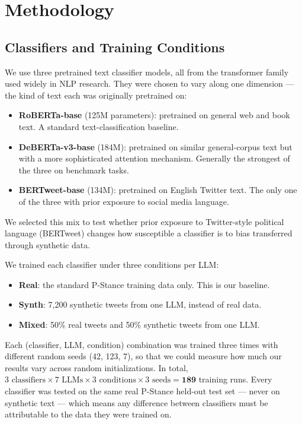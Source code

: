 \documentclass[11pt]{article}
\begin{document}
\section{Methodology}

\subsection{Classifiers and Training Conditions}

We use three pretrained text classifier models, all from the transformer family used widely in NLP research. They were chosen to vary along one dimension --- the kind of text each was originally pretrained on:
\begin{itemize}
    \item \textbf{RoBERTa-base} (125M parameters): pretrained on general web and book text. A standard text-classification baseline.
    \item \textbf{DeBERTa-v3-base} (184M): pretrained on similar general-corpus text but with a more sophisticated attention mechanism. Generally the strongest of the three on benchmark tasks.
    \item \textbf{BERTweet-base} (134M): pretrained on English Twitter text. The only one of the three with prior exposure to social media language.
\end{itemize}

We selected this mix to test whether prior exposure to Twitter-style political language (BERTweet) changes how susceptible a classifier is to bias transferred through synthetic data.

We trained each classifier under three conditions per LLM:
\begin{itemize}
    \item \textbf{Real}: the standard P-Stance training data only. This is our baseline.
    \item \textbf{Synth}: 7{,}200 synthetic tweets from one LLM, instead of real data.
    \item \textbf{Mixed}: 50\% real tweets and 50\% synthetic tweets from one LLM.
\end{itemize}

Each (classifier, LLM, condition) combination was trained three times with different random seeds (42, 123, 7), so that we could measure how much our results vary across random initializations. In total, $3 \text{ classifiers} \times 7 \text{ LLMs} \times 3 \text{ conditions} \times 3 \text{ seeds} = \mathbf{189}$ training runs. Every classifier was tested on the same real P-Stance held-out test set --- never on synthetic text --- which means any difference between classifiers must be attributable to the data they were trained on.
\end{document}
